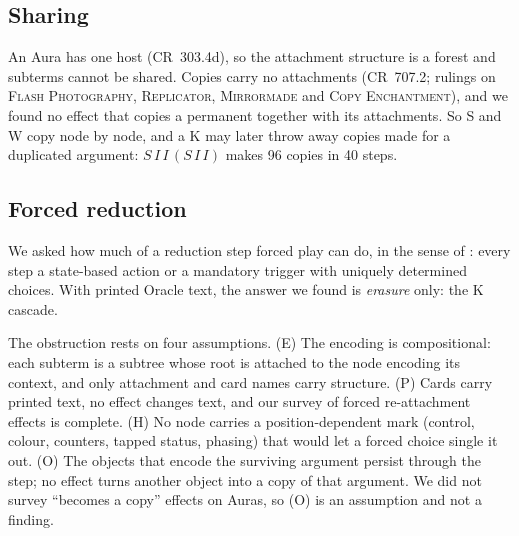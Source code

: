 \documentclass[11pt]{article}
\theoremstyle{definition}
\newcommand{\card}[1]{{\mdseries\scshape #1}}
\newcommand{\CR}[1]{CR~#1}
\begin{document}
\subsection{Sharing}

An Aura has one host (\CR{303.4d}), so the attachment structure is a forest and subterms
cannot be shared. Copies carry no attachments (\CR{707.2}; rulings on \card{Flash
Photography}, \card{Replicator}, \card{Mirrormade} and \card{Copy Enchantment}), and we found
no effect that copies a permanent together with its attachments. So S and W copy node by
node, and a K may later throw away copies made for a duplicated argument:
$S\,I\,I\,(S\,I\,I)$ makes 96 copies in 40 steps.

\subsection{Forced reduction}

We asked how much of a reduction step forced play can do, in the sense of
\citet{cbh2019}: every step a state-based action or a mandatory trigger with uniquely
determined choices. With printed Oracle text, the answer we found is \emph{erasure} only:
the K cascade.

The obstruction rests on four assumptions. (E) The encoding is compositional: each subterm
is a subtree whose root is attached to the node encoding its context, and only attachment
and card names carry structure. (P) Cards carry printed text, no effect changes text, and
our survey of forced re-attachment effects is complete. (H) No node carries a
position-dependent mark (control, colour, counters, tapped status, phasing) that would let
a forced choice single it out. (O) The objects that encode the surviving argument persist
through the step; no effect turns another object into a copy of that argument. We did not
survey ``becomes a copy'' effects on Auras, so (O) is an assumption and not a finding.
\end{document}

